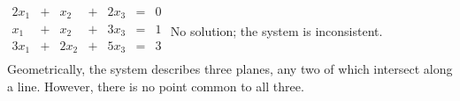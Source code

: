 {$\begin{array}{ccccccc}
2x_1&+&x_2&+&2x_3&=&0\\
x_1&+&x_2&+&3x_3&=&1\\
3x_1&+&2x_2&+&5x_3&=&3\\
\end{array}$}
{No solution; the system is inconsistent. Geometrically, the system describes three planes, any two of which intersect along a line. However, there is no point common to all three.}